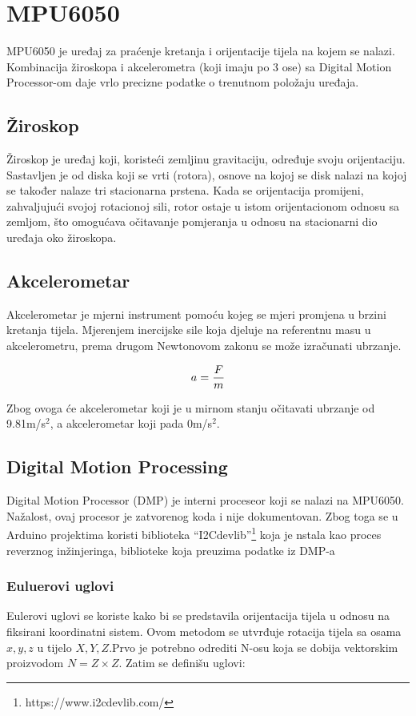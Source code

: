 \documentclass[../Document.tex]{subfiles}
\begin{document}
\section{MPU6050} \label{mpu}

MPU6050 je uređaj za praćenje kretanja i orijentacije tijela na kojem se nalazi. Kombinacija žiroskopa i akcelerometra (koji imaju po 3 ose) sa Digital Motion Processor-om daje vrlo precizne podatke o trenutnom položaju uređaja.

\subsection{Žiroskop}
Žiroskop je uređaj koji, koristeći zemljinu gravitaciju, određuje svoju orijentaciju. Sastavljen je od diska koji se vrti (rotora), osnove na kojoj se disk nalazi na kojoj se također nalaze tri stacionarna prstena. Kada se orijentacija promijeni, zahvaljujući svojoj rotacionoj sili, rotor ostaje u istom orijentacionom odnosu sa zemljom, što omogućava očitavanje pomjeranja u odnosu na stacionarni dio uređaja oko žiroskopa.


\subsection{Akcelerometar}
Akcelerometar je mjerni instrument pomoću kojeg se mjeri promjena u brzini kretanja tijela. Mjerenjem inercijske sile koja djeluje na referentnu masu u akcelerometru, prema drugom Newtonovom zakonu se može izračunati ubrzanje.

$$
    \centering
    a = \frac{F}{m}
$$

\noindent Zbog ovoga će akcelerometar koji je u mirnom stanju očitavati ubrzanje od 9.81m/s$^2$, a akcelerometar koji pada 0m/s$^2$.

\subsection{Digital Motion Processing}\label{dmp}

Digital Motion Processor (DMP) je interni proceseor koji se nalazi na MPU6050. Nažalost, ovaj procesor je zatvorenog koda i nije dokumentovan. Zbog toga se u Arduino projektima koristi biblioteka ``I2Cdevlib''\footnote{https://www.i2cdevlib.com/} koja je nstala kao proces reverznog inžinjeringa, biblioteke koja preuzima podatke iz DMP-a

\subsubsection{Euluerovi uglovi}
Eulerovi uglovi se koriste kako bi se predstavila orijentacija tijela u odnosu na fiksirani koordinatni sistem. Ovom metodom se utvrđuje rotacija tijela sa osama $x,y,z$ u tijelo $X,Y,Z$.Prvo je potrebno odrediti N-osu koja se dobija vektorskim proizvodom $N=Z \times Z$. Zatim se definišu uglovi:
\end{document}
